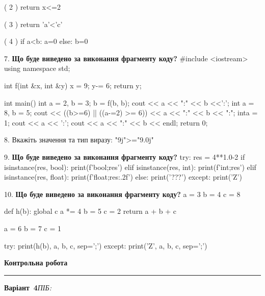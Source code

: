 \documentclass[11pt]{article}
\begin{document}
( 2 ) return x<=2

( 3 ) return 'a'<'c'

( 4 ) if a<b: a=0 else: b=0
\par\vspace{5mm}
7. \textbf{Що буде виведено за виконання фрагменту коду?}
#include <iostream>
using namespace std;

int f(int &x, int &y){
    x = 9;
    y-= 6;
    return y;
}

int main(){
    int a = 2, b = 3;
    b = f(b, b);
    cout << a << ":" << b <<':';
    {
        int a = 8, b = 5;
        cout << ((b>=6) || ((a-=2) >= 6))
             << a << ":" << b << ":";
    }
    {
        inta = 1;
        cout << a << ':';
    }
    cout << a << ":" << b << endl;
    return 0;
}

\par\vspace{5mm}
8. 
Вкажіть значення та тип виразу:
"9j">="9.0j"
\par\vspace{5mm}
9. \textbf{Що буде виведено за виконання фрагменту коду?}
try:
    res = 4**1.0-2
    if isinstance(res, bool):
        print(f'bool;{res}')
    elif isinstance(res, int):
        print(f'int;{res}')
    elif isinstance(res, float):
        print(f'float;{res:.2f}')
    else:
        print('???')
except:
    print('Z')
\par\vspace{5mm}
10. \textbf{Що буде виведено за виконання фрагменту коду?}
a = 3
b = 4
c = 8

def h(b):
global c    a *= 4
    b = 5
    c = 2
    return a + b + c

a = 6
b = 7
c = 1

try:
    print(h(b), a, b, c, sep=';')
except:
    print('Z', a, b, c, sep=';')
\par\vspace{5mm}










\newpage

\newpage

{\centering\Large\bfseries Контрольна робота\par}
\medskip
\noindent\rule{\linewidth}{0.5pt}
\smallskip
\noindent\textbf{Варіант \No\,4}\hfill \textit{ПІБ:}\,\underline{\hspace{60mm}}
\vspace{4mm}
\end{document}
